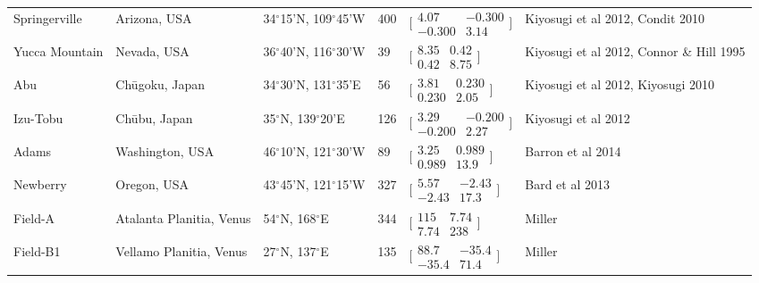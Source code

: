 \documentclass[12pt,letter]{article}
\begin{document}
\begin{table}
\begin{tabular}{p{2cm} p{2.5cm} p{2cm} l l p{3.5cm}}
Springerville &	Arizona, USA	&	34$^{\circ}$15'N, 109$^{\circ}$45'W	&	400	&	$\bigl[\begin{smallmatrix} 4.07&-0.300\\-0.300&3.14 \end{smallmatrix}\bigr]$	&	Kiyosugi et al 2012, Condit 2010\\
Yucca Mountain &	Nevada, USA	&	36$^{\circ}$40'N, 116$^{\circ}$30'W	&	39	&	$\bigl[\begin{smallmatrix} 8.35&0.42\\0.42&8.75 \end{smallmatrix}\bigr]$	&	Kiyosugi et al 2012, Connor \& Hill 1995\\
Abu		&	Ch\={u}goku, Japan	&	34$^{\circ}$30'N, 131$^{\circ}$35'E	&	56	&	$\bigl[\begin{smallmatrix} 3.81&0.230\\0.230&2.05 \end{smallmatrix}\bigr]$	&	Kiyosugi et al 2012, Kiyosugi 2010\\
Izu-Tobu	&	Ch\={u}bu, Japan	&	35$^{\circ}$N, 139$^{\circ}$20'E	&	126	&	$\bigl[\begin{smallmatrix} 3.29&-0.200\\-0.200&2.27 \end{smallmatrix}\bigr]$	&	Kiyosugi et al 2012\\
Adams		&	Washington, USA	&	46$^{\circ}$10'N, 121$^{\circ}$30'W	&	89	&	$\bigl[\begin{smallmatrix} 3.25&0.989\\0.989&13.9 \end{smallmatrix}\bigr]$	&	Barron et al 2014\\
Newberry	&	Oregon, USA	&	43$^{\circ}$45'N, 121$^{\circ}$15'W	&	327	&	$\bigl[\begin{smallmatrix} 5.57&-2.43\\-2.43&17.3 \end{smallmatrix}\bigr]$	&	Bard et al 2013\\
Field-A	&	Atalanta Planitia, Venus	&	54$^{\circ}$N, 168$^{\circ}$E	&	344	&	$\bigl[\begin{smallmatrix} 115&7.74\\7.74&238 \end{smallmatrix}\bigr]$	&	Miller\\
Field-B1	&	Vellamo Planitia, Venus	&	27$^{\circ}$N, 137$^{\circ}$E	&	135	&	$\bigl[\begin{smallmatrix} 88.7&-35.4\\-35.4&71.4 \end{smallmatrix}\bigr]$	&	Miller\\

\end{tabular}
\end{table}
\end{document}
